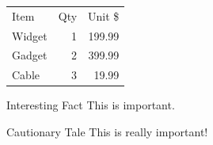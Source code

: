 \documentclass{beamer}
\begin{document}
\begin{frame}
\begin{tabular}{lrr}
Item   & Qty & Unit \$ \\
Widget & 1   & 199.99  \\
Gadget & 2   & 399.99  \\
Cable  & 3   & 19.99   \\
\end{tabular}
\end{frame}

\begin{frame}
\begin{block}{Interesting Fact}
This is important.
\end{block}
\begin{alertblock}{Cautionary Tale}
This is really important!
\end{alertblock}
\end{frame}
\end{document}

